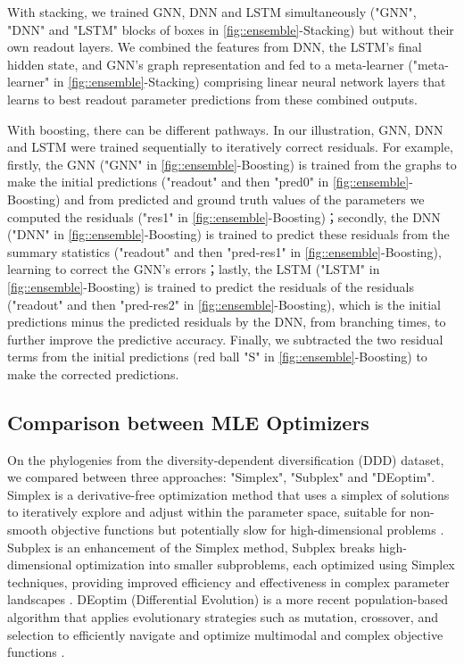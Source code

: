{With stacking, we trained GNN, DNN and LSTM simultaneously ("GNN", "DNN" and "LSTM" blocks of boxes in \autoref{fig::ensemble}-Stacking) but without their own readout layers. We combined the features from DNN, the LSTM's final hidden state, and GNN's graph representation and fed to a meta-learner ("meta-learner" in \autoref{fig::ensemble}-Stacking) comprising linear neural network layers that learns to best readout parameter predictions from these combined outputs. 

With boosting, there can be different pathways. In our illustration, GNN, DNN and LSTM were trained sequentially to iteratively correct residuals. For example, firstly, the GNN ("GNN" in \autoref{fig::ensemble}-Boosting) is trained from the graphs to make the initial predictions ("readout" and then "pred0" in \autoref{fig::ensemble}-Boosting) and from predicted and ground truth values of the parameters we computed the residuals ("res1" in \autoref{fig::ensemble}-Boosting)；secondly, the DNN ("DNN" in \autoref{fig::ensemble}-Boosting) is trained to predict these residuals from the summary statistics ("readout" and then "pred-res1" in \autoref{fig::ensemble}-Boosting), learning to correct the GNN's errors；lastly, the LSTM ("LSTM" in \autoref{fig::ensemble}-Boosting) is trained to predict the residuals of the residuals ("readout" and then "pred-res2" in \autoref{fig::ensemble}-Boosting), which is the initial predictions minus the predicted residuals by the DNN, from branching times, to further improve the predictive accuracy. Finally, we subtracted the two residual terms from the initial predictions (red ball "S" in \autoref{fig::ensemble}-Boosting) to make the corrected predictions.

\clearpage
\subsection{Comparison between MLE Optimizers}
\label{appendix::mle_optimizers}
On the phylogenies from the diversity-dependent diversification (DDD) dataset, we compared between three approaches: "Simplex", "Subplex" and "DEoptim". Simplex is a derivative-free optimization method that uses a simplex of solutions to iteratively explore and adjust within the parameter space, suitable for non-smooth objective functions but potentially slow for high-dimensional problems \citep{morgan_simplex_1974}. Subplex is an enhancement of the Simplex method, Subplex breaks high-dimensional optimization into smaller subproblems, each optimized using Simplex techniques, providing improved efficiency and effectiveness in complex parameter landscapes \citep{rowan_functional_1990}. DEoptim (Differential Evolution) is a more recent population-based algorithm that applies evolutionary strategies such as mutation, crossover, and selection to efficiently navigate and optimize multimodal and complex objective functions \citep{ardia_differential_2010}.

}
